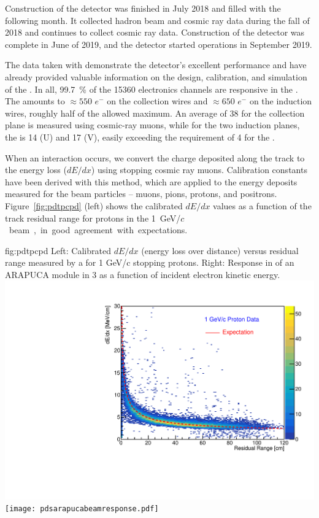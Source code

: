 Construction of the  detector was finished in July 2018 and filled with  the following month. It collected hadron beam and cosmic ray data during the fall of 2018 and continues to collect cosmic ray data.  Construction of the  detector was complete in June of 2019, and the detector started operations in September 2019.

The data taken with  demonstrate the detector's excellent performance and have already provided valuable information on the design, calibration, and simulation of the  . In all, \SI{99.7}{\%}  of the 15360  electronics channels are responsive in the . The  amounts to $\approx 550$ $e^{-}$ on the collection wires and $\approx 650$ $e^{-}$ on the induction wires, roughly half of the allowed maximum. An average  of 38 for the collection plane is measured using cosmic-ray muons, while for the two induction planes, the  is 14 (U) and 17 (V), easily exceeding the requirement of 4 %
for the  . 

When an interaction occurs, we convert the charge deposited along the track to the energy loss ($dE/dx$) using stopping cosmic ray muons. Calibration constants have been derived with this method, which are applied to the energy deposits measured for the beam particles -- muons, pions, protons, and positrons. %
Figure~\ref{fig:pdtpcpd} (left) shows the calibrated $dE/dx$ values as a function of the track residual range for protons in the \SI{1}{GeV/$c$} beam, in good agreement with expectations. 

\begin{dunefigure}
  {fig:pdtpcpd}
  {Left: Calibrated $dE/dx$ (energy loss over distance) versus residual range measured by a  for 1 GeV/c   
  stopping protons. Right: Response in  of an ARAPUCA  module in 3 as a function of incident electron kinetic energy.} 
  \includegraphics[width=0.47\linewidth]{graphics/dedx_rr_data_v5.pdf}
  \texttt{[image: pdsarapucabeamresponse.pdf]}
\end{dunefigure}
  
